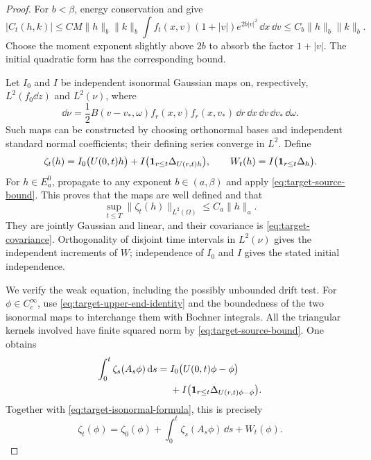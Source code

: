 \begin{proof}
For $b<\beta$, energy conservation and  give
\begin{equation}\label{eq:target-source-bound}
 |C_t(h,k)|\le CM\|h\|_b\|k\|_b
    \int f_t(x,v)(1+|v|)e^{2b|v|^2}\,\dd x\,\dd v
 \le C_b\|h\|_b\|k\|_b.
\end{equation}
Choose the moment exponent slightly above $2b$ to absorb the factor
$1+|v|$.  The initial quadratic form has the corresponding bound.

Let $I_0$ and $I$ be independent isonormal Gaussian maps on,
respectively, $L^2(f_0\dd z)$ and $L^2(\nu)$, where
\[
 \dd\nu=\frac12 B(v-v_*,\omega) f_r(x,v)f_r(x,v_*)
   \,\dd r\,\dd x\,\dd v\,\dd v_*\,\dd\omega.
\]
Such maps can be constructed by choosing orthonormal bases and
independent standard normal coefficients; their defining series
converge in $L^2$.  Define
\begin{equation}\label{eq:target-isonormal-formula}
 \zeta_t(h)=I_0\bigl(U(0,t)h\bigr)
       +I\bigl(\mathbf 1_{r\le t}\Delta_{U(r,t)h}\bigr),
 \qquad
 W_t(h)=I\bigl(\mathbf 1_{r\le t}\Delta_h\bigr).
\end{equation}
For $h\in E_a^0$, propagate to any exponent $b\in(a,\beta)$ and
apply \eqref{eq:target-source-bound}.  This proves that the maps are
well defined and that
\begin{equation}\label{eq:target-field-bound}
 \sup_{t\le T}\|\zeta_t(h)\|_{L^2(\Omega)}\le C_a\|h\|_a.
\end{equation}
They are jointly Gaussian and linear, and their covariance is
\eqref{eq:target-covariance}.  Orthogonality of disjoint time intervals
in $L^2(\nu)$ gives the independent increments of $W$; independence of
$I_0$ and $I$ gives the stated initial independence.

We verify the weak equation, including the possibly unbounded drift
test.  For $\phi\in C_c^\infty$, use
\eqref{eq:target-upper-end-identity} and the boundedness of the two
isonormal maps to interchange them with Bochner integrals.  All the
triangular kernels involved have finite squared norm by
\eqref{eq:target-source-bound}.  One obtains
\[
 \begin{split}
 \int_0^t\zeta_s(A_s\phi)\,\mathrm d s
 ={}&I_0\bigl(U(0,t)\phi-\phi\bigr)\\
 &+I\bigl(\mathbf 1_{r\le t}
                \Delta_{U(r,t)\phi-\phi}\bigr).
 \end{split}
\]
Together with \eqref{eq:target-isonormal-formula}, this is precisely
\[
 \zeta_t(\phi)=\zeta_0(\phi)
       +\int_0^t\zeta_s(A_s\phi)\,\dd s+W_t(\phi).
\]


\end{proof}
